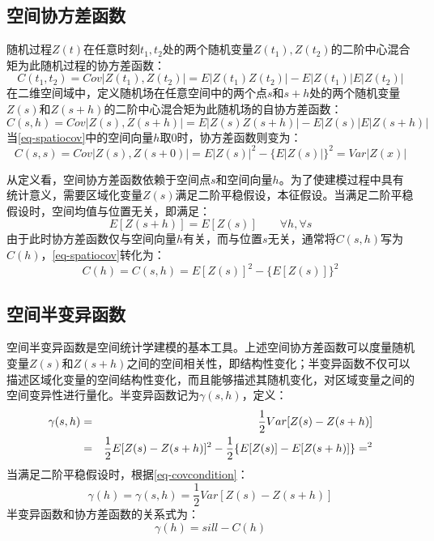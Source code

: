 \subsection{空间协方差函数}
随机过程$Z(t)$在任意时刻$t_1,t_2$处的两个随机变量$Z(t_1),Z(t_2)$的二阶中心混合矩为此随机过程的协方差函数：
\begin{equation}
    C(t_1,t_2) = Cov\left| Z(t_1),Z(t_2) \right| = E\left| Z(t_1)Z(t_2) \right| - E\left| Z(t_1) \right| E\left| Z(t_2) \right|
    \label{eq-temporalcov}
\end{equation}
在二维空间域中，定义随机场在任意空间中的两个点$s$和$s+h$处的两个随机变量$Z(s)$和$Z(s+h)$的二阶中心混合矩为此随机场的自协方差函数：
\begin{equation}
    C(s,h) = Cov\left| Z(s),Z(s+h) \right| = E\left| Z(s)Z(s+h) \right|-E\left| Z(s) \right| E\left| Z(s+h) \right|
    \label{eq-spatiocov}
\end{equation}
当\cref{eq-spatiocov}中的空间向量$h$取0时，协方差函数则变为：
\begin{equation}
    C(s,s) = Cov\left| Z(s), Z(s+0) \right| = E\left| Z(s) \right|^2 - \{ E\left| Z(s) \right| \}^2 = Var\left| Z(x) \right|
    \label{eq-spatiocovsimplize}
\end{equation}

从定义看，空间协方差函数依赖于空间点$s$和空间向量$h$。为了使建模过程中具有统计意义，需要区域化变量$Z(s)$满足二阶平稳假设，本征假设。当满足二阶平稳假设时，空间均值与位置无关，即满足：
\begin{equation}
    E[Z(s+h)] = E[Z(s)] \qquad \forall h,\forall s
    \label{eq-covcondition}
\end{equation}
由于此时协方差函数仅与空间向量$h$有关，而与位置$s$无关，通常将$C(s,h)$写为$C(h)$，\cref{eq-spatiocov}转化为：
\begin{equation}
    C(h)=C(s,h) = E[Z(s)]^2 - \{ E[Z(s)] \}^2
    \label{eq-conditionalcov}
\end{equation}

\subsection{空间半变异函数}
空间半变异函数是空间统计学建模的基本工具。上述\textcolor[rgb]{1,0,0}{空间协方差函数可以度量随机变量$Z(s)$和$Z(s+h)$之间的空间相关性，即结构性变化}；半变异函数不仅可以描述区域化变量的空间结构性变化，而且能够描述其随机变化，对区域变量之间的空间变异性进行量化。半变异函数记为$\gamma(s,h)$，定义：
\begin{eqnarray}
    \gamma(s,h) &=&\dfrac{1}{2}Var[Z(s)-Z(s+h)] \notag \\
    &=& \dfrac{1}{2}E[Z(s)-Z(s+h)]^2 - \dfrac{1}{2}\{ E[Z(s)] - E[Z(s+h)] \}=^2 
    \label{eq-gammapre}
\end{eqnarray}
当满足二阶平稳假设时，根据\cref{eq-covcondition}：
\begin{equation}
    \gamma(h) = \gamma(s,h) = \dfrac{1}{2}Var[Z(s) - Z(s+h)]
    \label{eq-gamma}
\end{equation}
半变异函数和协方差函数的关系式为：
\begin{equation}
    \gamma(h) = sill-C(h)
    \label{eq-gammacov}
\end{equation}

